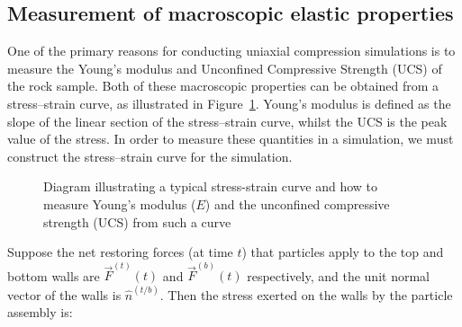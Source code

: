 \subsection{Measurement of macroscopic elastic properties}

One of the primary reasons for conducting uniaxial compression simulations is to measure the Young's modulus and Unconfined Compressive Strength (UCS) of the rock sample. Both of these macroscopic properties can be obtained from a stress--strain curve, as illustrated in Figure~\ref{fig:stress_strain_diag}. Young's modulus is defined as the slope of the linear section of the stress--strain curve, whilst the UCS is the peak value of the stress. In order to measure these quantities in a simulation, we must construct the stress--strain curve for the simulation. 

\begin{figure}
\begin{center}
\end{center}
\caption[Diagram illustrating a typical stress-strain curve \& how to measure Young's modulus ($E$) \& the unconfined compressive strength (UCS) from such a curve]{Diagram illustrating a typical stress-strain curve and how to measure Young's modulus ($E$) and the unconfined compressive strength (UCS) from such a curve} \label{fig:stress_strain_diag}
\end{figure}

Suppose the net restoring forces (at time $t$) that particles apply to the top and bottom walls are $\vec{F}^{(t)} (t)$ and $\vec{F}^{(b)} (t)$ respectively, and the unit normal vector of the walls is $\hat{n}^{(t/b)}$. Then the stress exerted on the walls by the particle assembly is:

